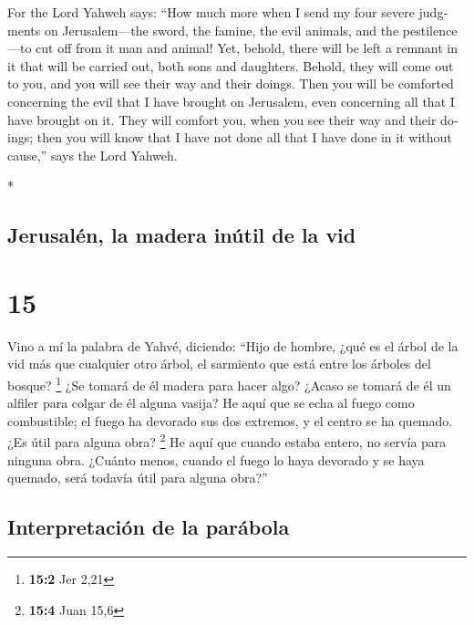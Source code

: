 \begin{paracol}{2}
\begin{otherlanguage}{english}
 For the Lord Yahweh says: ``How much more when I send my
four severe judgments on Jerusalem---the sword, the famine, the evil
animals, and the pestilence---to cut off from it man and animal!
 Yet, behold, there will be left a remnant in it that
will be carried out, both sons and daughters. Behold, they will come out
to you, and you will see their way and their doings. Then you will be
comforted concerning the evil that I have brought on Jerusalem, even
concerning all that I have brought on it.  They will
comfort you, when you see their way and their doings; then you will know
that I have not done all that I have done in it without cause,'' says
the Lord Yahweh.

\end{otherlanguage}

\switchcolumn[0]*

\hypertarget{jerusaluxe9n-la-madera-inuxfatil-de-la-vid}{%
\subsection{Jerusalén, la madera inútil de la
vid}\label{jerusaluxe9n-la-madera-inuxfatil-de-la-vid}}

\hypertarget{section-28}{%
\section{15}\label{section-28}}

 Vino a mí la palabra de Yahvé, diciendo: 
``Hijo de hombre, ¿qué es el árbol de la vid más que cualquier otro
árbol, el sarmiento que está entre los árboles del bosque? \footnote{\textbf{15:2}
  Jer 2,21}  ¿Se tomará de él madera para hacer algo?
¿Acaso se tomará de él un alfiler para colgar de él alguna vasija?
 He aquí que se echa al fuego como combustible; el fuego
ha devorado sus dos extremos, y el centro se ha quemado. ¿Es útil para
alguna obra? \footnote{\textbf{15:4} Juan 15,6}  He aquí
que cuando estaba entero, no servía para ninguna obra. ¿Cuánto menos,
cuando el fuego lo haya devorado y se haya quemado, será todavía útil
para alguna obra?''

\hypertarget{interpretaciuxf3n-de-la-paruxe1bola}{%
\subsection{Interpretación de la
parábola}\label{interpretaciuxf3n-de-la-paruxe1bola}}


\end{paracol}

